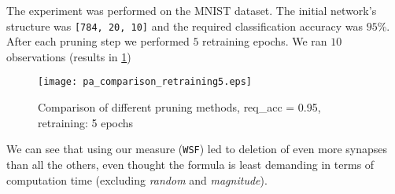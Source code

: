 The experiment was performed on the MNIST dataset. The initial network's structure was \texttt{[784, 20, 10]} and the required classification accuracy was $ 95\% $. After each pruning step we performed $ 5 $ retraining epochs. We ran $ 10 $ observations (results in \cref{fig:discussion:pa_comparison_retraining5}) 

\begin{figure}[H]
\centering
\texttt{[image: pa\_comparison\_retraining5.eps]}
\caption{Comparison of different pruning methods, req\_acc = 0.95, retraining: 5 epochs}
\label{fig:discussion:pa_comparison_retraining5}
\end{figure}

We can see that using our measure (\texttt{WSF}) led to deletion of even more synapses than all the others, even thought the formula is least demanding in terms of computation time (excluding \textit{random} and \textit{magnitude}).